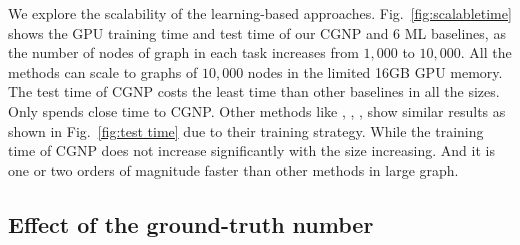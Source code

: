   We explore the scalability of the
learning-based approaches. Fig.~\ref{fig:scalabletime} shows the GPU
training time and test time of our CGNP and 6 ML baselines, as the
number of nodes of graph in each task increases from $1,000$ to
$10,000$.
%
%
All the methods can scale to graphs of $10,000$ nodes in the limited 16GB GPU memory.
%  
%  
The test time of CGNP costs the least time than other baselines in all
the sizes. Only \Featrans spends close time to CGNP. Other methods
like \MAML, \Reptile, \PN, \AQDGNN show similar results as shown in
Fig.~\ref{fig:test time} due to their training strategy.
%
%
While the training time of CGNP does not increase significantly with
the size increasing. And it is one or two orders of magnitude faster
than other methods in large graph.






\subsection{Effect of the ground-truth number}
\label{sec:exp:labels}


